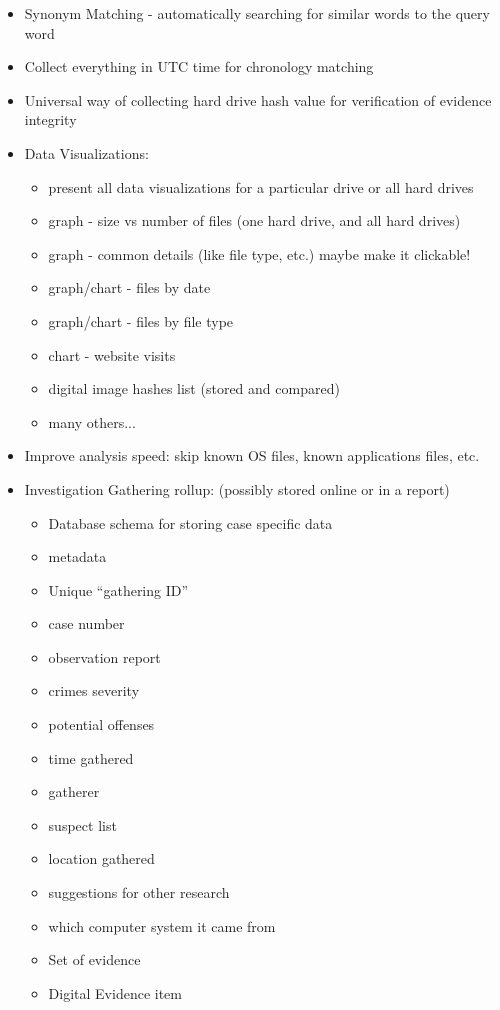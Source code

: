 \documentclass[12pt]{article}
\begin{document}
{\begin{itemize}
  \item Synonym Matching - automatically searching for similar words to the query word
  \item Collect everything in UTC time for chronology matching
  \item Universal way of collecting hard drive hash value for verification of evidence integrity
  \item Data Visualizations:
  \begin{itemize}
    \item present all data visualizations for a particular drive or all hard drives
    \item graph - size vs number of files (one hard drive, and all hard drives)
    \item graph - common details (like file type, etc.) maybe make it clickable!
    \item graph/chart - files by date
    \item graph/chart - files by file type
    \item chart - website visits
    \item digital image hashes list (stored and compared)
    \item many others...
  \end{itemize}
  \item Improve analysis speed: skip known OS files, known applications files, etc.
  \item Investigation Gathering rollup: (possibly stored online or in a report)
  \begin{itemize}
    \item Database schema for storing case specific data
    \item metadata
    \item Unique ``gathering ID''
    \item case number
    \item observation report
    \item crimes severity
    \item potential offenses
    \item time gathered
    \item gatherer
    \item suspect list
    \item location gathered
    \item suggestions for other research
    \item which computer system it came from
    \item Set of evidence
    \item Digital Evidence item

\end{itemize}
\end{itemize}}
\end{document}
